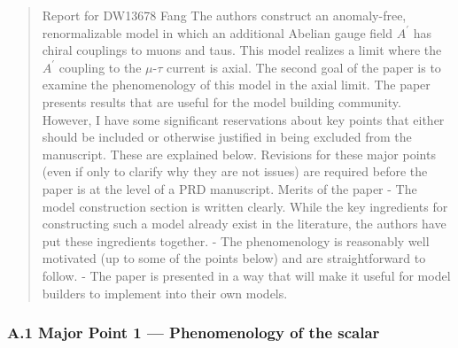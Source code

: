 \documentclass[
]{article}
\begin{document}
\begin{quote}
Report for DW13678 Fang The authors construct an anomaly-free,
renormalizable model in which an additional Abelian gauge field
\(A^{\prime}\) has chiral couplings to muons and taus. This model
realizes a limit where the \(A^{\prime}\) coupling to the
\(\mu\)-\(\tau\) current is axial. The second goal of the paper is to
examine the phenomenology of this model in the axial limit. The paper
presents results that are useful for the model building community.
However, I have some significant reservations about key points that
either should be included or otherwise justified in being excluded from
the manuscript. These are explained below. Revisions for these major
points (even if only to clarify why they are not issues) are required
before the paper is at the level of a PRD manuscript. Merits of the
paper - The model construction section is written clearly. While the key
ingredients for constructing such a model already exist in the
literature, the authors have put these ingredients together. - The
phenomenology is reasonably well motivated (up to some of the points
below) and are straightforward to follow. - The paper is presented in a
way that will make it useful for model builders to implement into their
own models.
\end{quote}

\subsubsection{A.1 Major Point 1 --- Phenomenology of the
scalar}\label{a.1-major-point-1-phenomenology-of-the-scalar}
\end{document}
